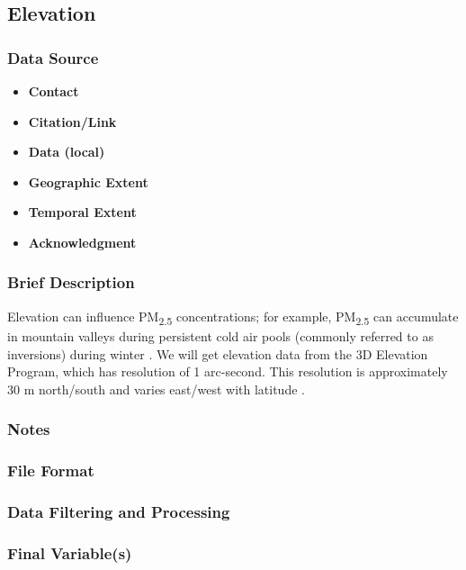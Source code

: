 \subsection{Elevation}
\subsubsection*{Data Source}
\begin{itemize}[nolistsep]
\item \textbf{Contact}
\item \textbf{Citation/Link}
\item \textbf{Data (local)}
\item \textbf{Geographic Extent}
\item \textbf{Temporal Extent}
\item \textbf{Acknowledgment}
\end{itemize}
\subsubsection*{Brief Description}

Elevation can influence PM\textsubscript{2.5} concentrations; for example, PM\textsubscript{2.5} can accumulate in mountain valleys during persistent cold air pools 
(commonly referred to as inversions) 
during winter \citep{Whiteman2014}. We will get elevation data from the 3D Elevation Program, which has resolution of 1 arc-second. This resolution is approximately 30 m north/south and varies east/west with latitude \citep{USGSElevation2017}.

\subsubsection*{Notes}
\subsubsection*{File Format}
\subsubsection*{Data Filtering and Processing}
\subsubsection*{Final Variable(s)}
